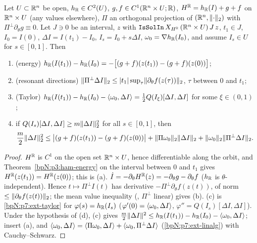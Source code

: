 \begin{lemma}\label{bpN:p7:energy-core}
Let $U\subset\mathbb{R}^n$ be open, $h_{\mathbb{R}}\in C^2(U)$, $g,f\in C^1(\mathbb{R}^n\times U;\mathbb{R})$, $H^{\mathbb{R}}=h_{\mathbb{R}}(I)+g+f$ on $\mathbb{R}^n\times U$ (any values elsewhere), $\Pi$ an orthogonal projection of $(\mathbb{R}^n,\lVert \cdot\rVert_2)$ with $\Pi^\perp\partial_\theta g\equiv0$. Let $J\ni0$ be an interval, $z$ with $\texttt{IsSolIn}\,X_{H^{\mathbb{R}}}\,(\mathbb{R}^n\times U)\,J\,z$, $t_1\in J$, $I_0=I(0)$, $\Delta I=I(t_1)-I_0$, $I_s=I_0+s\Delta I$, $\omega_0=\nabla h_{\mathbb{R}}(I_0)$, and assume $I_s\in U$ for $s\in[0,1]$. Then
\begin{enumerate}[label=(\alph*)]
\item (energy) $h_{\mathbb{R}}(I(t_1))-h_{\mathbb{R}}(I_0)=-\bigl[(g+f)(z(t_1))-(g+f)(z(0))\bigr]$;
\item (resonant directions) $\lVert \Pi^\perp\Delta I\rVert_2\le\lvert t_1\rvert\sup_\tau\lVert \partial_\theta f(z(\tau))\rVert_2$, $\tau$ between $0$ and $t_1$;
\item (Taylor) $h_{\mathbb{R}}(I(t_1))-h_{\mathbb{R}}(I_0)-\langle \omega_0,\Delta I\rangle=\frac12Q(I_\xi)[\Delta I,\Delta I]$ for some $\xi\in(0,1)$;
\item if $Q(I_s)[\Delta I,\Delta I]\ge m\lVert \Delta I\rVert_2^2$ for all $s\in[0,1]$, then
\[\frac m2\lVert \Delta I\rVert_2^2\le\bigl\lvert(g+f)(z(t_1))-(g+f)(z(0))\bigr\rvert+\lVert \Pi\omega_0\rVert_2\lVert \Delta I\rVert_2+\lVert \omega_0\rVert_2\lVert \Pi^\perp\Delta I\rVert_2 .\]
\end{enumerate}
\end{lemma}
\begin{proof}
\label{stepN:p7:ec-energy} $H^{\mathbb{R}}$ is $C^1$ on the open set $\mathbb{R}^n\times U$, hence differentiable along the orbit, and Theorem~\ref{bpN:p3:ham-energy} on the interval between $0$ and $t_1$ gives $H^{\mathbb{R}}(z(t_1))=H^{\mathbb{R}}(z(0))$; this is (a).
\label{stepN:p7:ec-proj} $\dot I=-\partial_\theta H^{\mathbb{R}}(z)=-\partial_\theta g-\partial_\theta f$ ($h_{\mathbb{R}}$ is $\theta$-independent). Hence $t\mapsto\Pi^\perp I(t)$ has derivative $-\Pi^\perp\partial_\theta f(z(t))$, of norm $\le\lVert \partial_\theta f(z(t))\rVert_2$; the mean value inequality (, $\Pi^\perp$ linear) gives (b).
\label{stepN:p7:ec-taylor} (c) is \ref{bpN:p7:ext-taylor} for $\varphi(s)=h_{\mathbb{R}}(I_s)$ ($\varphi'(0)=\langle \omega_0,\Delta I\rangle$, $\varphi''=Q(I_s)[\Delta I,\Delta I]$). Under the hypothesis of (d), (c) gives $\frac m2\lVert \Delta I\rVert^2\le h_{\mathbb{R}}(I(t_1))-h_{\mathbb{R}}(I_0)-\langle \omega_0,\Delta I\rangle$; insert (a), and $\langle \omega_0,\Delta I\rangle=\langle \Pi\omega_0,\Delta I\rangle+\langle \omega_0,\Pi^\perp\Delta I\rangle$ (\ref{bpN:p7:ext-linalg}) with Cauchy--Schwarz.
\end{proof}

